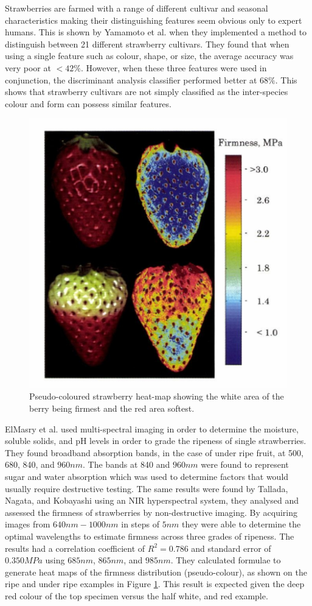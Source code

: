 \documentclass[fleqn,twoside,12pt]{report}
\begin{document}
Strawberries are farmed with a range of different cultivar and seasonal characteristics making their distinguishing features seem obvious only to expert humans. This is shown by Yamamoto et al.\cite{yamamoto} when they implemented a method to distinguish between 21 different strawberry cultivars. They found that when using a single feature such as colour, shape, or size, the average accuracy was very poor at $<42\%$. However, when these three features were used in conjunction, the discriminant analysis classifier performed better at $68\%$. This shows that strawberry cultivars are not simply classified as the inter-species colour and form can possess similar features. 


\begin{figure}[h]
	\centering
	\includegraphics[width=0.5\linewidth]{multispec_strawberry.png}
	\caption{Pseudo-coloured strawberry heat-map showing the white area of the berry being firmest and the red area softest\cite{elmasry2}.}
	\label{fig:multispec_strawberry}
\end{figure}%

ElMasry et al.\cite{elmasry2} used multi-spectral imaging in order to determine the moisture, soluble solids, and pH levels in order to grade the ripeness of single strawberries. They found broadband absorption bands, in the case of under ripe fruit, at 500, 680, 840, and $960nm$. The bands at 840 and $960nm$ were found to represent sugar and water absorption which was used to determine factors that would usually require destructive testing. The same results were found by Tallada, Nagata, and Kobayashi \cite{tallada} using an NIR hyperspectral system, they analysed and assessed the firmness of strawberries by non-destructive imaging. By acquiring images from $640nm-1000nm$ in steps of $5nm$ they were able to determine the optimal wavelengths to estimate firmness across three grades of ripeness. The results had a correlation coefficient of $R^2=0.786$ and standard error of $0.350MPa$ using $685nm$, $865nm$, and $985nm$. They calculated formulae to generate heat maps of the firmness distribution (pseudo-colour), as shown on the ripe and under ripe examples in Figure \ref{fig:multispec_strawberry}. This result is expected given the deep red colour of the top specimen versus the half white, and red example.
\end{document}

